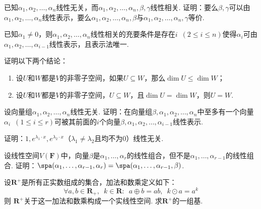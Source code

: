 \begin{exercise}
\begin{exgroup}
        \item 已知$\alpha_1,\alpha_2,\ldots,\alpha_n$线性无关，而$\alpha_1,\alpha_2,\ldots,\alpha_n,\beta,\gamma$线性相关. 证明：要么$\beta,\gamma$可以由$\alpha_1,\alpha_2,\ldots,\alpha_n$线性表示，要么$\alpha_1,\alpha_2,\ldots,\alpha_n,\beta$与$\alpha_1,\alpha_2,\ldots,\alpha_n,\gamma$等价.
    \end{exgroup}

    \begin{exgroup}
        \item 已知$\alpha_1\neq 0$，则$\alpha_1,\alpha_2,\ldots,\alpha_n$线性相关的充要条件是存在$i\enspace(2 \leqslant i \leqslant n)$使得$\alpha_i$可由$\alpha_1,\alpha_2,\ldots,\alpha_{i-1}$线性表示，且表示法唯一.

        \item 证明以下两个结论：
        \begin{enumerate}
            \item 设$U$和$W$都是$V$的非零子空间，如果$U\subseteq W$，那么$\dim U \leqslant \dim W$；

            \item 设$U$和$W$都是$V$的非零子空间，$U\subseteq W$，且$\dim U = \dim W$，则$U = W$.
        \end{enumerate}

        \item 设向量组$\alpha_1,\alpha_2,\ldots,\alpha_n$线性无关. 证明：在向量组$\beta,\alpha_1,\alpha_2,\ldots,\alpha_n$中至多有一个向量$\alpha_i\enspace(1 \leqslant i \leqslant r)$可被其前面的$i$个向量$\beta,\alpha_1,\alpha_2,\ldots,\alpha_{i-1}$线性表示.

        \item 证明：$1,e^{\lambda_1\cdot x},e^{\lambda_2\cdot x}$（$\lambda_1\neq\lambda_2$且均不为0）线性无关.

        \item 设线性空间$V(\mathbf{F})$中，向量$\beta$是$\alpha_1,\ldots,\alpha_r$的线性组合，但不是$\alpha_1,\ldots,\alpha_{r-1}$的线性组合. 证明：$\spa(\alpha_1,\ldots,\alpha_{r-1},\alpha_r)=\spa(\alpha_1,\ldots,\alpha_{r-1},\beta)$.

        \item 设$\mathbf{R}^+$是所有正实数组成的集合，加法和数乘定义如下：
        \[ \forall a,b \in \mathbf{R}_+,\enspace k\in \mathbf{R}\colon\enspace a\oplus b = ab,\enspace k\odot a = a^k \]
        则 $\mathbf{R}^+$关于这一加法和数乘构成一个实线性空间. 求$\mathbf{R}^+$的一组基.
    \end{exgroup}


\end{exercise}
